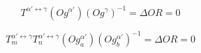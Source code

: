 $$T^{\alpha'\leftrightarrow\gamma}\left(Og^{\alpha'}\right)\left(Og^{\gamma}\right)^{-1} = \Delta OR = 0 \label{eq:1}$$

$$T_{m}^{\alpha'\leftrightarrow\gamma}T_{n}^{\alpha'\leftrightarrow\gamma}\left(Og_{a}^{\alpha'}\right)\left(Og_{b}^{\alpha'}\right)^{-1} = \Delta OR = 0 \label{eq:2}$$
